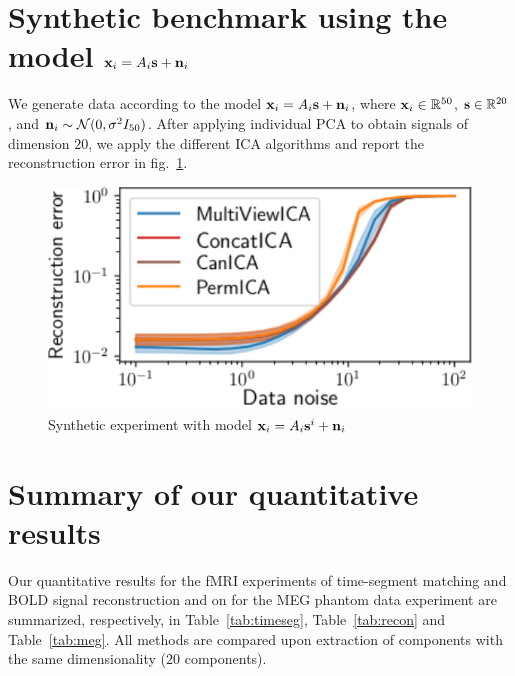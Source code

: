 \documentclass[12pt]{report}
\begin{document}
\section{Synthetic benchmark using the model $\mathbf{x}_i = A_i\mathbf{s} + \mathbf{n}_i$}
\label{app:complex_cov}
We generate data according to the model $\mathbf{x}_i = A_i\mathbf{s} + \mathbf{n}_i$, where $\mathbf{x}_i \in \mathbb{R}^{50}$, $\mathbf{s} \in \mathbb{R}^{20}$, and $\mathbf{n}_i\sim \mathcal{N}(0, \sigma^2 I_{50})$. After applying individual PCA to obtain signals of dimension $20$, we apply the different ICA algorithms and report the reconstruction error in fig.~\ref{fig:reconstruction_synth}.

\begin{figure}
  \center
  \includegraphics[width=0.5\linewidth]{figures/mvica/distance.pdf}
  \caption{Synthetic experiment with model $\mathbf{x}_i = A_i\mathbf{s}^i + \mathbf{n}_i$} %
  \label{fig:reconstruction_synth}
\end{figure}

\section{Summary of our quantitative results}
\label{sec:app_real_data}
Our quantitative results for the fMRI experiments of time-segment matching and BOLD signal reconstruction and on for the MEG phantom data experiment are summarized, respectively, in Table~\ref{tab:timeseg}, Table~\ref{tab:recon} and Table~\ref{tab:meg}. All methods are compared upon extraction of components with the same dimensionality ($20$ components).
\end{document}
